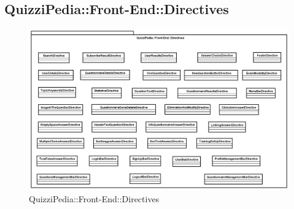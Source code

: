\newpage

\subsection{QuizziPedia::Front-End::Directives}

\label{QuizziPedia::Front-End::Directives}
\begin{figure} [ht]
	\centering
	\includegraphics[scale=0.45]{UML/Package/QuizziPedia_Front-End_Directives.png}
	\caption{QuizziPedia::Front-End::Directives}
\end{figure}

